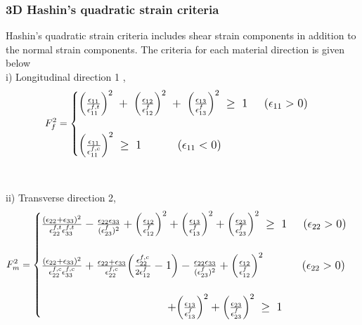 \documentclass[a4paper,12pt]{extarticle}
\begin{document}
\subsubsection{3D Hashin's quadratic strain criteria}\label{3D Hashin's quadratic strain criteria}
\indent\indent\indent Hashin's quadratic strain criteria includes shear strain components in addition to the normal strain components. The criteria for each material direction is given below\\

i) Longitudinal direction 1 ,
\\
\begin{equation}
\large{F_{f}^{2} =  
	\begin{cases}
	
		\Big(\frac{\epsilon_{11}}{\epsilon_{11}^{f,t}}\Big)^{2} \; + \; \Big(\frac{\epsilon_{12}}{\epsilon_{12}^{f}}\Big)^{2} \; + \; \Big(\frac{\epsilon_{13}}{\epsilon_{13}^{f}}\Big)^{2} \; \geq  \; 1  \; \; \; \; \;  (\epsilon_{11}  >  0)  \\
	\\
	\Big(\frac{\epsilon_{11}}{\epsilon_{11}^{f,c}}\Big)^{2}  \; \geq  \; 1 \; \; \; \; \; \; \;  \; \; \; \;  (\epsilon_{11}  <  0) 

	
	\end{cases}}
\end{equation}
\\
\\
ii) Transverse direction 2,
\\
\begin{equation}
\large{F_{m}^{2} =  
	\begin{cases}
	
	\frac{(\epsilon_{22} + \epsilon_{33} )^{2}}{\epsilon_{22}^{f,t} \epsilon_{33}^{f,t}}   -  \frac{\epsilon_{22}\epsilon_{33}}{(\epsilon_{23}^{f})^{2}}  +  \Big(\frac{\epsilon_{12}}{\epsilon_{12}^{f}}\Big)^{2}  + \Big(\frac{\epsilon_{13}}{\epsilon_{13}^{f}}\Big)^{2}  +  \Big(\frac{\epsilon_{23}}{\epsilon_{23}^{f}}\Big)^{2} \;\geq  \; 1 \; \; \; \; \;  (\epsilon_{22}  >  0) \\
	\\
	
	\frac{(\epsilon_{22} + \epsilon_{33} )^{2}}{\epsilon_{22}^{f,c} \epsilon_{33}^{f,c}}  +  \frac{\epsilon_{22} + \epsilon_{33}}{\epsilon_{22}^{f,c}}\Big(\frac{\epsilon_{22}^{f,c}}{2\epsilon_{12}^{f}}  -  1\Big)   -  \frac{\epsilon_{22}\epsilon_{33}}{(\epsilon_{23}^{f})^{2}}  +  \Big(\frac{\epsilon_{12}}{\epsilon_{12}^{f}}\Big)^{2}\; \; \; \; \; \; \; \; \; \; \; \;  (\epsilon_{22}  >  0) \\ 
\\	
	\; \; \; \; \; \; \; \;\; \; \; \; \; \; \; \;\; \; \; \; \; \; \; \;  \; \;\; \; \; \; \; \; \; \;\; \; \; \; \;  + \Big(\frac{\epsilon_{13}}{\epsilon_{13}^{f}}\Big)^{2}   +  \Big(\frac{\epsilon_{23}}{\epsilon_{23}^{f}}\Big)^{2} \;\geq \; 1 
	
	
	\end{cases}}
\end{equation}
\end{document}
